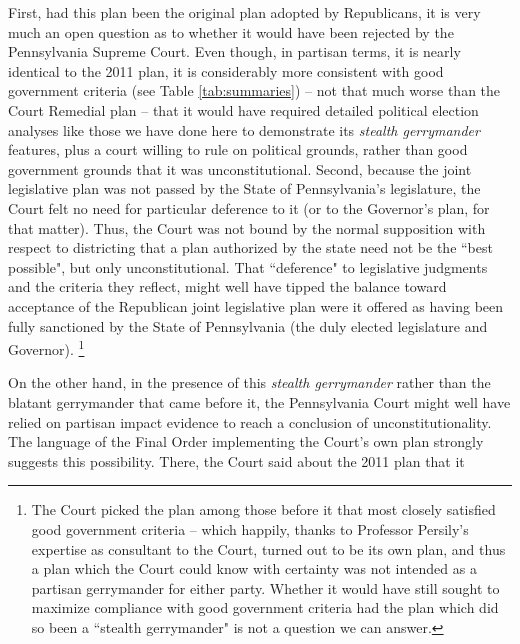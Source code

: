     First, had this plan been the original plan adopted by Republicans, it is very much an open question as to whether it would have been rejected by the Pennsylvania Supreme Court. Even though, in partisan terms, it is nearly identical to the 2011 plan, it is considerably more consistent with good government criteria (see Table \ref{tab:summaries}) -- not that much worse than the Court Remedial plan -- that it would have required detailed political election analyses like those we have done here to demonstrate its \textit{stealth gerrymander} features, plus a court willing to rule on political grounds, rather than good government grounds that it was unconstitutional. Second, because the joint legislative plan was not passed by the State of Pennsylvania's legislature, the Court felt no need for particular deference to it (or to the Governor's plan, for that matter). Thus, the Court was not bound by the normal supposition with respect to districting that a plan authorized by the state need not be the ``best possible", but only unconstitutional. That ``deference" to legislative judgments and the criteria they reflect, might well have tipped the balance toward acceptance of the Republican joint legislative plan were it offered as having been fully sanctioned by the State of Pennsylvania (the duly elected legislature and Governor). 
        \footnote{The Court picked the plan among those before it that most closely satisfied good government criteria -- which happily, thanks to Professor Persily's expertise as consultant to the Court, turned out to be its own plan, and thus a plan which the Court could know with certainty was not intended as a partisan gerrymander for either party. Whether it would have still sought to maximize compliance with good government criteria had the plan which did so been a ``stealth gerrymander" is not a question we can answer.}       
\par    
    On the other hand, in the presence of this \textit{stealth gerrymander} rather than the blatant gerrymander that came before it, the Pennsylvania Court might well have relied on partisan impact evidence to reach a conclusion of unconstitutionality. The language of the Final Order implementing the Court's own plan strongly suggests this possibility. There, the Court said about the 2011 plan that it 
